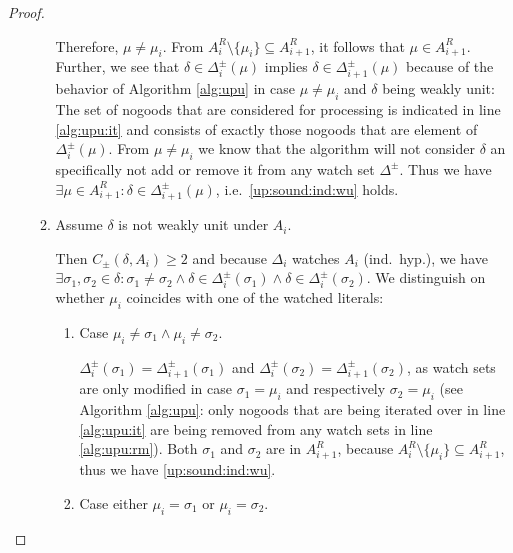 \documentclass{vutinfth} %
\newcommand{\ass}{A}
\newcommand{\cdpm}{C_\pm}
\newcommand{\dpm}{\Delta^\pm}
\newcommand{\sgl}{\mu}
\newcommand{\bsgl}{\sigma}
\begin{document}
\begin{proof}
\begin{enumerate}
\begin{enumerate}
	Therefore, $\sgl \not = \sgl_i$. From $\ass_{i}^R \setminus \{ \sgl_i \} \subseteq \ass_{i+1}^R$, it follows that $\sgl \in \ass_{i+1}^R$. Further, we see that $\delta \in \dpm_{i}(\sgl)$ implies $\delta \in \Delta_{i+1}^\pm(\sgl)$ because of the behavior of Algorithm \ref{alg:upu} in case $\sgl \not = \sgl_i$ and $\delta$ being weakly unit: The set of nogoods that are considered for processing is indicated in line \ref{alg:upu:it} and consists of exactly those nogoods that are element of $\dpm_{i}(\sgl)$. From $\sgl \not = \sgl_i$ we know that the algorithm will not consider $\delta$ an specifically not add or remove it from any watch set $\dpm$. Thus we have $\exists \sgl \in \ass_{i+1}^R : \delta \in \dpm_{i+1}(\sgl)$, i.e.~\ref{up:sound:ind:wu} holds.
	\item Assume $\delta$ is not weakly unit under $A_i$.
	
	Then $\cdpm(\delta, \ass_{i}) \geq 2$ and because $\Delta_i$ watches $A_i$ (ind.~hyp.), we have $\exists \bsgl_1, \bsgl_2 \in \delta : \bsgl_1 \not = \bsgl_2 \wedge \delta \in \Delta_i^\pm(\bsgl_1) \wedge \delta \in \Delta_i^\pm(\bsgl_2)$. We distinguish on whether $\sgl_i$ coincides with one of the watched literals:

	\begin{enumerate}
		\item Case $\sgl_i \not = \bsgl_1 \wedge \sgl_i \not = \bsgl_2$.
		
		$\Delta_i^\pm(\bsgl_1) = \Delta_{i+1}^\pm(\bsgl_1)$ and $\Delta_i^\pm(\bsgl_2) = \Delta_{i+1}^\pm(\bsgl_2)$, as watch sets are only modified in case $\bsgl_1 = \sgl_i$ and respectively $\bsgl_2 = \sgl_i$ (see Algorithm \ref{alg:upu}: only nogoods that are being iterated over in line \ref{alg:upu:it} are being removed from any watch sets in line \ref{alg:upu:rm}). Both $\bsgl_1$ and $\bsgl_2$ are in $A_{i+1}^R$, because $\ass_{i}^R \setminus \{ \sgl_i \} \subseteq \ass_{i+1}^R$, thus we have \ref{up:sound:ind:wu}.
		
		\item Case either $\sgl_i = \bsgl_1$ or $\sgl_i = \bsgl_2$.
		\label{sigmaprimes}		
		

\end{enumerate}
\end{enumerate}
\end{enumerate}
\end{proof}
\end{document}

